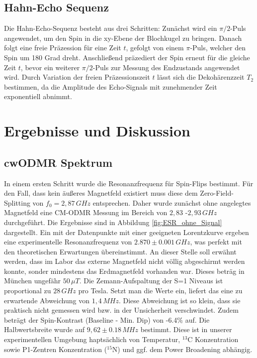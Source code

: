 \documentclass[12pt, a4paper]{article}
\begin{document}
\subsection{Hahn-Echo Sequenz}
Die Hahn-Echo-Sequenz besteht aus drei Schritten: Zunächst wird ein $\pi/2$-Puls angewendet, um den Spin in die xy-Ebene der Blochkugel zu bringen. Danach folgt eine freie Präzession für eine Zeit $t$, gefolgt von einem $\pi$-Puls, welcher den Spin um 180 Grad dreht. Anschließend präzediert der Spin erneut für die gleiche Zeit $t$, bevor ein weiterer $\pi/2$-Puls zur Messung des Endzustands angewendet wird. Durch Variation der freien Präzessionszeit $t$ lässt sich die Dekohärenzzeit $T_2$ bestimmen, da die Amplitude des Echo-Signals mit zunehmender Zeit exponentiell abnimmt.

\section{Ergebnisse und Diskussion}
\subsection{cwODMR Spektrum}
In einem ersten Schritt wurde die Resonanzfrequenz für Spin-Flips bestimmt. Für den Fall, dass kein äußeres Magnetfeld existiert muss diese dem Zero-Field-Splitting von $f_0=2,87\,\si{GHz}$ entsprechen. Daher wurde zunächst ohne angelegtes Magnetfeld eine CM-ODMR Messung im Bereich von $2,83$ -$2,93 \,\si{GHz}$ durchgeführt. Die Ergebnisse sind in Abbildung \ref{fig:ESR_ohne_Signal} dargestellt. Ein mit der Datenpunkte mit einer geeigneten Lorentzkurve ergeben eine experimentelle Resonanzfrequenz von $2.870\pm0.001 \,\si{GHz}$, was perfekt mit den theoretischen Erwartungen übereinstimmt. An dieser Stelle soll erwähnt werden, dass im Labor das externe Magnetfeld nicht völlig abgeschirmt werden konnte, sonder mindestens das Erdmagnetfeld vorhanden war. Dieses beträg in München ungefähr $50 \,\si{\mu T}$. Die Zemann-Aufspaltung der S=1 Niveaus ist proportional zu $28\,\si{GHz}$ pro Tesla. Setzt man die Werte ein, liefert das eine zu erwartende Abweichung von $1,4\,\si{MHz}$. Diese Abweichung ist so klein, dass sie praktisch nicht gemessen wird bzw. in der Unsicherheit verschwindet. Zudem beträgt der Spin-Kontrast (Baseline - Min. Dip) von -6.4\% auf. Die Halbwertsbreite wurde auf $9,62\pm0.18 \,\si{MHz}$ bestimmt. Diese ist in unserer experimentellen Umgebung haptsächlich von Temperatur, $^{13}\text{C}$ Konzentration sowie P1-Zentren Konzentration ($^{15}\text{N}$) und ggf. dem Power Broadening abhängig.
\end{document}
